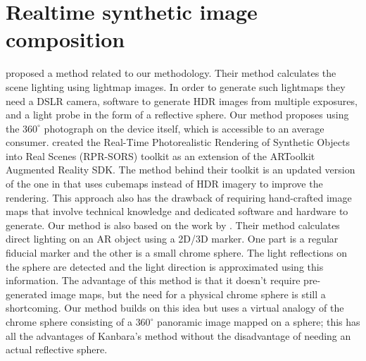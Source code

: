 \section{Realtime synthetic image composition}
\citep{agusanto2003} proposed a method related to our methodology. Their method calculates the scene lighting using lightmap images. In order to generate such lightmaps they need a DSLR camera, software to generate HDR images from multiple exposures, and a light probe in the form of a reflective sphere. Our method proposes using the $360^{\circ}$ photograph on the device itself, which is accessible to an average consumer.\newline
\citep{pessoa2011} created the Real-Time Photorealistic Rendering of Synthetic Objects into Real Scenes (RPR-SORS) toolkit as an extension of the ARToolkit Augmented Reality SDK. The method behind their toolkit is an updated version of the one in \citet{agusanto2003} that uses cubemaps instead of HDR imagery to improve the rendering. This approach also has the drawback of requiring hand-crafted image maps that involve technical knowledge and dedicated software and hardware to generate.\newline
Our method is also based on the work by \citep{kanbara2004}. Their method calculates direct lighting on an AR object using a 2D/3D marker. One part is a regular fiducial marker and the other is a small chrome sphere. The light reflections on the sphere are detected and the light direction is approximated using this information. The advantage of this method is that it doesn't require pre-generated image maps, but the need for a physical chrome sphere is still a shortcoming. Our method builds on this idea but uses a virtual analogy of the chrome sphere consisting of a $360^{\circ}$ panoramic image mapped on a sphere; this has all the advantages of Kanbara's method without the disadvantage of needing an actual reflective sphere.